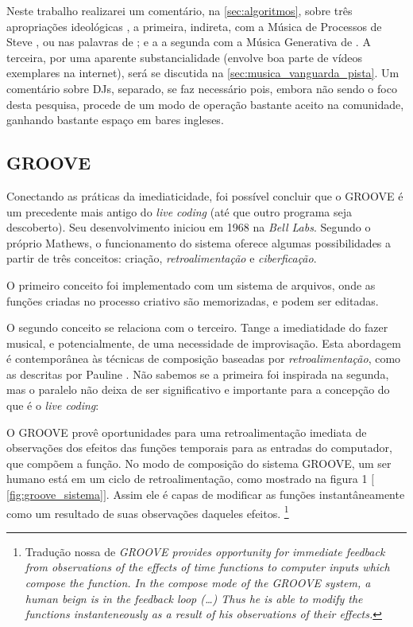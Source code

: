 Neste trabalho realizarei um comentário, na \autoref{sec:algoritmos}, sobre três apropriações ideológicas , a primeira, indireta, com a Música de Processos de Steve , ou nas palavras de ; e a a segunda com a Música Generativa de . A terceira, por uma aparente substancialidade (envolve boa parte de vídeos exemplares na internet), será se discutida na \autoref{sec:musica_vanguarda_pista}. Um comentário sobre DJs, separado, se faz necessário pois, embora não sendo o foco desta pesquisa, procede de um modo de operação bastante aceito na comunidade, ganhando bastante espaço em bares ingleses.

\subsection{GROOVE}\label{sec:groove}

Conectando as práticas da imediaticidade, foi possível concluir que o GROOVE \cite{mathews_groove_1970,di_nunzio_genesi_2010} é um precedente mais antigo do \emph{live coding} (até que outro programa seja descoberto). Seu desenvolvimento iniciou em 1968 na \emph{Bell Labs}. Segundo o próprio Mathews, o funcionamento do sistema oferece algumas possibilidades a partir de três conceitos: criação, \emph{retroalimentação} e \emph{ciberficação}. 

O primeiro conceito foi implementado com um sistema de arquivos, onde as funções criadas no processo criativo são memorizadas, e podem ser editadas.

O segundo conceito se relaciona com o terceiro. Tange a imediatidade do fazer musical, e potencialmente, de uma necessidade de improvisação. Esta abordagem é contemporânea às técnicas de composição baseadas por \emph{retroalimentação}, como as descritas por Pauline . Não sabemos se a primeira foi inspirada na segunda, mas o paralelo não deixa de ser significativo e importante para a concepção do que é o \emph{live coding}:

\begin{citacao}
O GROOVE provê oportunidades para uma retroalimentação imediata de observações dos efeitos das funções temporais para as entradas do computador, que compõem a função. No modo de composição do sistema GROOVE, um ser humano está em um ciclo de retroalimentação, como mostrado na figura 1 $[$\autoref{fig:groove_sistema}$]$. Assim ele é capas de modificar as funções instantâneamente como um resultado de suas observações daqueles efeitos.\cite[p.~715]{mathews_groove_1970}
\footnote{Tradução nossa de \emph{GROOVE provides opportunity for immediate feedback from observations of the effects of time functions to computer inputs which compose the function. In the compose mode of the GROOVE system, a human beign is in the feedback loop (\ldots) Thus he is able to modify the functions instanteneously as a result of his observations of their effects.}}
\end{citacao}


